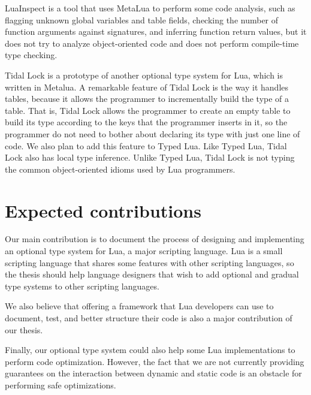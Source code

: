 \documentclass[preprint]{sig-alternate}
\begin{document}
LuaInspect \cite{luainspect} is a tool that uses MetaLua to perform
some code analysis, such as flagging unknown global variables and
table fields, checking the number of function arguments against
signatures, and inferring function return values, but it does not
try to analyze object-oriented code and does not perform compile-time
type checking.

Tidal Lock \cite{tidallock} is a prototype of another optional type
system for Lua, which is written in Metalua.
A remarkable feature of Tidal Lock is the way it handles tables,
because it allows the programmer to incrementally build the type of
a table.
That is, Tidal Lock allows the programmer to create an empty table to
build its type according to the keys that the programmer inserts in it,
so the programmer do not need to bother about declaring its type with
just one line of code.
We also plan to add this feature to Typed Lua.
Like Typed Lua, Tidal Lock also has local type inference.
Unlike Typed Lua, Tidal Lock is not typing the common object-oriented
idioms used by Lua programmers.

\section{Expected contributions} \label{sec:con}

Our main contribution is to document the process of designing and
implementing an optional type system for Lua, a major scripting
language.
Lua is a small scripting language that shares some features with other
scripting languages, so the thesis should help language designers
that wish to add optional and gradual type systems to other
scripting languages.

We also believe that offering a framework that Lua developers can
use to document, test, and better structure their code is also a
major contribution of our thesis.

Finally, our optional type system could also help some Lua
implementations to perform code optimization.
However, the fact that we are not currently providing guarantees on
the interaction between dynamic and static code is an obstacle for
performing safe optimizations.



\end{document}
